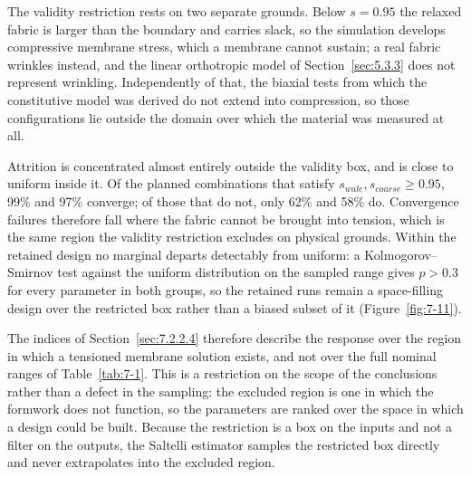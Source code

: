 The validity restriction rests on two separate grounds. Below \(s = 0.95\) the
relaxed fabric is larger than the boundary and carries slack, so the simulation
develops compressive membrane stress, which a membrane cannot sustain; a real
fabric wrinkles instead, and the linear orthotropic model of
Section~\ref{sec:5.3.3} does not represent wrinkling. Independently of that, the
biaxial tests from which the constitutive model was derived do not extend into
compression, so those configurations lie outside the domain over which the
material was measured at all.

Attrition is concentrated almost entirely outside the validity box, and is close
to uniform inside it. Of the planned combinations that satisfy
\(s_{wale}, s_{course} \geq 0.95\), 99\% and 97\% converge; of those that do not,
only 62\% and 58\% do. Convergence failures therefore fall where the fabric
cannot be brought into tension, which is the same region the validity
restriction excludes on physical grounds. Within the retained design no marginal
departs detectably from uniform: a Kolmogorov--Smirnov test against the uniform
distribution on the sampled range gives \(p > 0.3\) for every parameter in both
groups, so the retained runs remain a space-filling design over the restricted
box rather than a biased subset of it (Figure~\ref{fig:7-11}).

The indices of Section~\ref{sec:7.2.2.4} therefore describe the response over the
region in which a tensioned membrane solution exists, and not over the full
nominal ranges of Table~\ref{tab:7-1}. This is a restriction on the scope of the
conclusions rather than a defect in the sampling: the excluded region is one in
which the formwork does not function, so the parameters are ranked over the space
in which a design could be built. Because the restriction is a box on the inputs
and not a filter on the outputs, the Saltelli estimator samples the restricted
box directly and never extrapolates into the excluded region.
